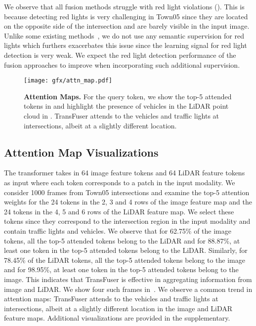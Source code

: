 \documentclass[final]{cvpr}
\newcommand{\boldparagraph}[1]{\vspace{0.1cm}\noindent{\bf #1:}}
\begin{document}
\boldparagraph{Limitations} We observe that all fusion methods struggle with red light violations (). This is because detecting red lights is very challenging in Town05 since they are located on the opposite side of the intersection and are barely visible in the input image. Unlike some existing methods~\cite{Toromanoff2020CVPR}, we do not use any semantic supervision for red lights which furthers exacerbates this issue since the learning signal for red light detection is very weak. We expect the red light detection performance of the fusion approaches to improve when incorporating such additional supervision.


\begin{figure}
    \centering
    \texttt{[image: gfx/attn\_map.pdf]}
    \caption{\textbf{Attention Maps.} For the {\color{darkyellow}{yellow}} query token, we show the top-5 attended tokens in {\color{darkgreen}{green}} and highlight the presence of vehicles in the LiDAR point cloud in {\color{red}{red}}. TransFuser attends to the vehicles and traffic lights at intersections, albeit at a slightly different location.}
    \vspace{-0.1cm}
    \label{fig:attn_map}
    \vspace{-0.3cm}
\end{figure}

\subsection{Attention Map Visualizations} \label{sec:visualizations} The transformer takes in 64 image feature tokens and 64 LiDAR feature tokens as input where each token corresponds to a  patch in the input modality. We consider 1000 frames from Town05 intersections and examine the top-5 attention weights for the 24 tokens in the 2, 3 and 4 rows of the image feature map and the 24 tokens in the 4, 5 and 6 rows of the LiDAR feature map. We select these tokens since they correspond to the intersection region in the input modality and contain traffic lights and vehicles. We observe that for 62.75\% of the image tokens, all the top-5 attended tokens belong to the LiDAR and for 88.87\%, at least one token in the top-5 attended tokens belong to the LiDAR. Similarly, for 78.45\% of the LiDAR tokens, all the top-5 attended tokens belong to the image and for 98.95\%, at least one token in the top-5 attended tokens belong to the image. This indicates that TransFuser is effective in aggregating information from image and LiDAR. We show four such frames in~. We observe a common trend in attention maps: TransFuser attends to the vehicles and traffic lights at intersections, albeit at a slightly different location in the image and LiDAR feature maps. Additional visualizations are provided in the supplementary.
\end{document}
